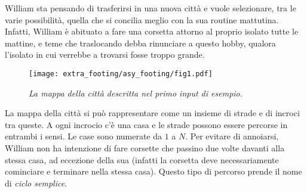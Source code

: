 \usepackage{xcolor}
\usepackage{afterpage}
\usepackage{pifont,mdframed}
\usepackage[bottom]{footmisc}
\usepackage{wrapfig}
\usepackage[colorlinks = true,linkcolor = black,urlcolor  = blue,citecolor = black,anchorcolor = black]{hyperref}


\newcommand{\inputfile}{\texttt{input.txt}}
\newcommand{\outputfile}{\texttt{output.txt}}

\newenvironment{warning}
  {\par\begin{mdframed}[linewidth=2pt,linecolor=gray]%
    \begin{list}{}{\leftmargin=1cm
                   \labelwidth=\leftmargin}\item[\Large\ding{43}]}
  {\end{list}\end{mdframed}\par}


	{
	\vspace{-.95cm}\hfill{}
	}
	\vspace{.5cm}

	William sta pensando di trasferirsi in una nuova città e vuole selezionare, tra le varie possibilità, quella che si concilia meglio con la sua routine mattutina. Infatti, William è abituato a fare una corsetta attorno al proprio isolato tutte le mattine, e teme che traslocando debba rinunciare a questo hobby, qualora l'isolato in cui verrebbe a trovarsi fosse troppo grande.

	\begin{wrapfigure}{r}{0.3\textwidth}
	  \begin{center}
	    \texttt{[image: extra\_footing/asy\_footing/fig1.pdf]}
	  \end{center}
	  \caption{\emph{La mappa della città descritta nel primo input di esempio.}}
	\end{wrapfigure}

	La mappa della città si può rappresentare come un insieme di strade e di incroci tra queste. A ogni incrocio c'è una casa e le strade possono essere percorse in entrambi i sensi. Le case sono numerate da $1$ a $N$.
	Per evitare di annoiarsi, William non ha intenzione di fare corsette che passino due volte davanti alla stessa casa, ad eccezione della sua (infatti la corsetta deve necessariamente cominciare e terminare nella stessa casa). Questo tipo di percorso prende il nome di \emph{ciclo semplice}.

